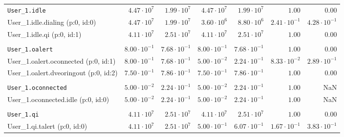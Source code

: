 \begin{table}[htbp]
{\begin{tabular}{lrrrrrr}
\\[-8pt]\texttt{User\_1.idle}                         &  $4.47 \cdot 10^{7}$ &  $1.99 \cdot 10^{7}$ &  $4.47 \cdot 10^{7}$ &  $1.99 \cdot 10^{7}$ &               $1.00$ &               $0.00$ \\
\hspace{3mm}User\_1.idle.dialing (p:0, id:0)          &  $4.47 \cdot 10^{7}$ &  $1.99 \cdot 10^{7}$ &  $3.60 \cdot 10^{6}$ &  $8.80 \cdot 10^{6}$ & $2.41 \cdot 10^{-1}$ & $4.28 \cdot 10^{-1}$ \\
\hspace{3mm}User\_1.idle.qi (p:0, id:1)               &  $4.11 \cdot 10^{7}$ &  $2.51 \cdot 10^{7}$ &  $4.11 \cdot 10^{7}$ &  $2.51 \cdot 10^{7}$ &               $1.00$ &               $0.00$ \\
\\[-8pt]\texttt{User\_1.oalert}                       & $8.00 \cdot 10^{-1}$ & $7.68 \cdot 10^{-1}$ & $8.00 \cdot 10^{-1}$ & $7.68 \cdot 10^{-1}$ &               $1.00$ &               $0.00$ \\
\hspace{3mm}User\_1.oalert.oconnected (p:0, id:1)     & $8.00 \cdot 10^{-1}$ & $7.68 \cdot 10^{-1}$ & $5.00 \cdot 10^{-2}$ & $2.24 \cdot 10^{-1}$ & $8.33 \cdot 10^{-2}$ & $2.89 \cdot 10^{-1}$ \\
\hspace{3mm}User\_1.oalert.dveoringout (p:0, id:2)    & $7.50 \cdot 10^{-1}$ & $7.86 \cdot 10^{-1}$ & $7.50 \cdot 10^{-1}$ & $7.86 \cdot 10^{-1}$ &               $1.00$ &               $0.00$ \\
\\[-8pt]\texttt{User\_1.oconnected}                   & $5.00 \cdot 10^{-2}$ & $2.24 \cdot 10^{-1}$ & $5.00 \cdot 10^{-2}$ & $2.24 \cdot 10^{-1}$ &               $1.00$ &                  NaN \\
\hspace{3mm}User\_1.oconnected.idle (p:0, id:0)       & $5.00 \cdot 10^{-2}$ & $2.24 \cdot 10^{-1}$ & $5.00 \cdot 10^{-2}$ & $2.24 \cdot 10^{-1}$ &               $1.00$ &                  NaN \\
\\[-8pt]\texttt{User\_1.qi}                           &  $4.11 \cdot 10^{7}$ &  $2.51 \cdot 10^{7}$ &  $4.11 \cdot 10^{7}$ &  $2.51 \cdot 10^{7}$ &               $1.00$ &               $0.00$ \\
\hspace{3mm}User\_1.qi.talert (p:0, id:0)             &  $4.11 \cdot 10^{7}$ &  $2.51 \cdot 10^{7}$ & $5.00 \cdot 10^{-1}$ & $6.07 \cdot 10^{-1}$ & $1.67 \cdot 10^{-1}$ & $3.83 \cdot 10^{-1}$ \\

\end{tabular}}
\end{table}
